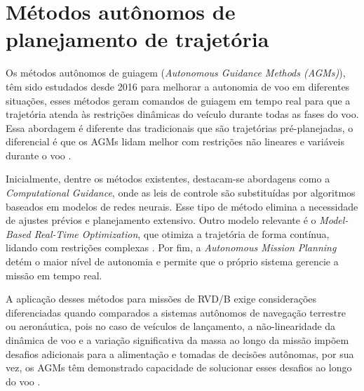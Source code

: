 
\section{Métodos autônomos de planejamento de trajetória}

Os métodos autônomos de guiagem (\emph{Autonomous Guidance Methods  (AGMs)}), têm sido estudados desde 2016 para melhorar a autonomia de voo em diferentes situações, esses métodos geram comandos de guiagem em tempo real para que a trajetória atenda às restrições dinâmicas do veículo durante todas as fases do voo.
Essa abordagem é diferente das tradicionais que são trajetórias pré-planejadas, o diferencial é que os AGMs lidam melhor com restrições não lineares e variáveis durante o voo \cite{song2023}.

Inicialmente, dentre os métodos existentes, destacam-se abordagens como a \emph{Computational Guidance}, onde as leis de controle são substituídas por algoritmos baseados em modelos de redes neurais.
Esse tipo de método elimina a necessidade de ajustes prévios e planejamento extensivo.
Outro modelo relevante é o \emph{Model-Based Real-Time Optimization}, que otimiza a trajetória de forma contínua, lidando com restrições complexas \cite{song2023}. Por fim, a \emph{Autonomous Mission Planning} detém o maior nível de autonomia e permite que o próprio sistema gerencie a missão em tempo real.

A aplicação desses métodos para missões de RVD/B exige considerações diferenciadas quando comparados a sistemas autônomos de navegação terrestre ou aeronáutica, pois no caso de veículos de lançamento, a não-linearidade da dinâmica de voo e a variação significativa da massa ao longo da missão impõem desafios adicionais para a alimentação e tomadas de decisões autônomas, por sua vez, os AGMs têm demonstrado capacidade de solucionar esses desafios ao longo do voo \cite{song2023}.